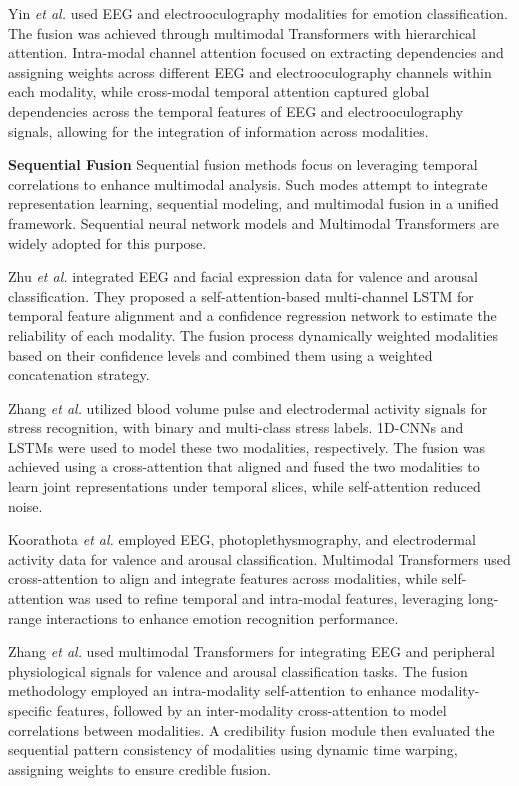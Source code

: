 \documentclass[journal]{IEEEtran}
\begin{document}
Yin \emph{et al.} \cite{Yin2024} used EEG and electrooculography modalities for emotion classification. The fusion was achieved through multimodal Transformers with hierarchical attention. Intra-modal channel attention focused on extracting dependencies and assigning weights across different EEG and electrooculography channels within each modality, while cross-modal temporal attention captured global dependencies across the temporal features of EEG and electrooculography signals, allowing for the integration of information across modalities.

\textbf{Sequential Fusion} Sequential fusion methods focus on leveraging temporal correlations to enhance multimodal analysis. Such modes attempt to integrate representation learning, sequential modeling, and multimodal fusion in a unified framework. Sequential neural network models and Multimodal Transformers are widely adopted for this purpose.

Zhu \emph{et al.} \cite{Zhu2024} integrated EEG and facial expression data for valence and arousal classification. They proposed a self-attention-based multi-channel LSTM for temporal feature alignment and a confidence regression network to estimate the reliability of each modality. The fusion process dynamically weighted modalities based on their confidence levels and combined them using a weighted concatenation strategy.

Zhang \emph{et al.} \cite{Zhang2024a} utilized blood volume pulse and electrodermal activity signals for stress recognition, with binary and multi-class stress labels. 1D-CNNs and LSTMs were used to model these two modalities, respectively. The fusion was achieved using a cross-attention that aligned and fused the two modalities to learn joint representations under temporal slices, while self-attention reduced noise.

Koorathota \emph{et al.} \cite{Koorathota2022} employed EEG, photoplethysmography, and electrodermal activity data for valence and arousal classification. Multimodal Transformers used cross-attention to align and integrate features across modalities, while self-attention was used to refine temporal and intra-modal features, leveraging long-range interactions to enhance emotion recognition performance.

Zhang \emph{et al.} \cite{Zhang2024} used multimodal Transformers for integrating EEG and peripheral physiological signals for valence and arousal classification tasks. The fusion methodology employed an intra-modality self-attention to enhance modality-specific features, followed by an inter-modality cross-attention to model correlations between modalities. A credibility fusion module then evaluated the sequential pattern consistency of modalities using dynamic time warping, assigning weights to ensure credible fusion.
\end{document}
